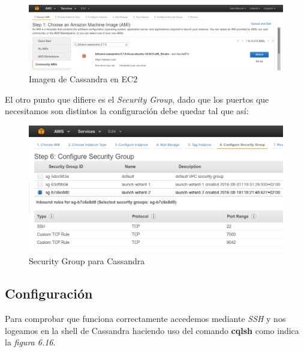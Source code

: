 \begin{figure}[!ht]
  \begin{center}
    \includegraphics[scale=0.30]{../images/cassandra/1.png}
		\caption{Imagen de Cassandra en EC2}
    \label{fig:kaa}
	\end{center}
\end{figure}

El otro punto que difiere es el \textit{Security Group}, dado que los puertos que necesitamos son distintos la configuración debe quedar tal que así:

\begin{figure}[!ht]
  \begin{center}
    \includegraphics[scale=0.30]{../images/cassandra/2.png}
		\caption{Security Group para Cassandra}
    \label{fig:kaa}
	\end{center}
\end{figure}

\newpage

\subsection{Configuración}

Para comprobar que funciona correctamente accedemos mediante \textit{SSH} y nos logeamos en la shell de Cassandra haciendo uso del comando \textbf{cqlsh} como indica la \textit{figura 6.16}.

